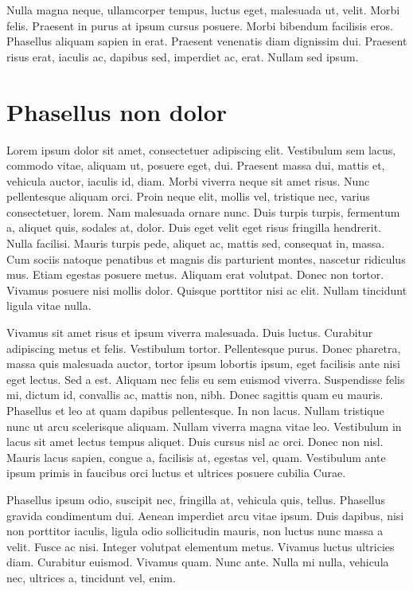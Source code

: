 \documentclass[../hdr.tex]{subfiles}
\begin{document}
Nulla magna neque, ullamcorper tempus, luctus eget, malesuada ut, velit. Morbi
felis. Praesent in purus at ipsum cursus posuere. Morbi bibendum facilisis eros.
Phasellus aliquam sapien in erat. Praesent venenatis diam dignissim dui.
Praesent risus erat, iaculis ac, dapibus sed, imperdiet ac, erat. Nullam sed
ipsum. 

\section{Phasellus non dolor}

Lorem ipsum dolor sit amet, consectetuer adipiscing elit. Vestibulum sem lacus,
commodo vitae, aliquam ut, posuere eget, dui. Praesent massa dui, mattis et,
vehicula auctor, iaculis id, diam. Morbi viverra neque sit amet risus. Nunc
pellentesque aliquam orci. Proin neque elit, mollis vel, tristique nec, varius
consectetuer, lorem. Nam malesuada ornare nunc. Duis turpis turpis, fermentum a,
aliquet quis, sodales at, dolor. Duis eget velit eget risus fringilla hendrerit.
Nulla facilisi. Mauris turpis pede, aliquet ac, mattis sed, consequat in, massa.
Cum sociis natoque penatibus et magnis dis parturient montes, nascetur ridiculus
mus. Etiam egestas posuere metus. Aliquam erat volutpat. Donec non tortor.
Vivamus posuere nisi mollis dolor. Quisque porttitor nisi ac elit. Nullam
tincidunt ligula vitae nulla.

Vivamus sit amet risus et ipsum viverra malesuada. Duis luctus. Curabitur
adipiscing metus et felis. Vestibulum tortor. Pellentesque purus. Donec
pharetra, massa quis malesuada auctor, tortor ipsum lobortis ipsum, eget
facilisis ante nisi eget lectus. Sed a est. Aliquam nec felis eu sem euismod
viverra. Suspendisse felis mi, dictum id, convallis ac, mattis non, nibh. Donec
sagittis quam eu mauris. Phasellus et leo at quam dapibus pellentesque. In non
lacus. Nullam tristique nunc ut arcu scelerisque aliquam. Nullam viverra magna
vitae leo. Vestibulum in lacus sit amet lectus tempus aliquet. Duis cursus nisl
ac orci. Donec non nisl. Mauris lacus sapien, congue a, facilisis at, egestas
vel, quam. Vestibulum ante ipsum primis in faucibus orci luctus et ultrices
posuere cubilia Curae.

Phasellus ipsum odio, suscipit nec, fringilla at, vehicula quis, tellus.
Phasellus gravida condimentum dui. Aenean imperdiet arcu vitae ipsum. Duis
dapibus, nisi non porttitor iaculis, ligula odio sollicitudin mauris, non luctus
nunc massa a velit. Fusce ac nisi. Integer volutpat elementum metus. Vivamus
luctus ultricies diam. Curabitur euismod. Vivamus quam. Nunc ante. Nulla mi
nulla, vehicula nec, ultrices a, tincidunt vel, enim.
\end{document}

